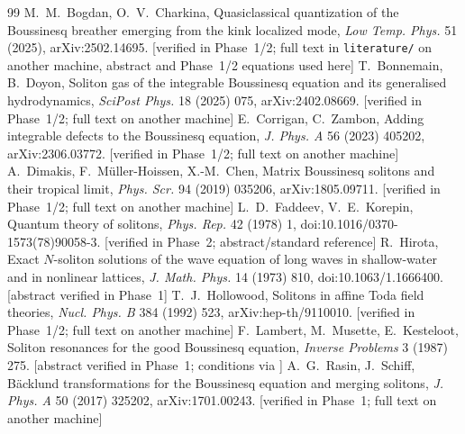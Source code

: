 \documentclass[11pt,a4paper]{article}
\theoremstyle{remark}
\begin{document}
\begin{thebibliography}{99}\small
{} M.~M.~Bogdan, O.~V.~Charkina, Quasiclassical quantization of the Boussinesq breather emerging from the kink localized mode, \emph{Low Temp. Phys.} 51 (2025), arXiv:2502.14695. [verified in Phase~1/2; full text in \texttt{literature/} on another machine, abstract and Phase~1/2 equations used here]
 T.~Bonnemain, B.~Doyon, Soliton gas of the integrable Boussinesq equation and its generalised hydrodynamics, \emph{SciPost Phys.} 18 (2025) 075, arXiv:2402.08669. [verified in Phase~1/2; full text on another machine]
 E.~Corrigan, C.~Zambon, Adding integrable defects to the Boussinesq equation, \emph{J. Phys. A} 56 (2023) 405202, arXiv:2306.03772. [verified in Phase~1/2; full text on another machine]
 A.~Dimakis, F.~M\"uller-Hoissen, X.-M.~Chen, Matrix Boussinesq solitons and their tropical limit, \emph{Phys. Scr.} 94 (2019) 035206, arXiv:1805.09711. [verified in Phase~1/2; full text on another machine]
 L.~D.~Faddeev, V.~E.~Korepin, Quantum theory of solitons, \emph{Phys. Rep.} 42 (1978) 1, doi:10.1016/0370-1573(78)90058-3. [verified in Phase~2; abstract/standard reference]
 R.~Hirota, Exact $N$-soliton solutions of the wave equation of long waves in shallow-water and in nonlinear lattices, \emph{J. Math. Phys.} 14 (1973) 810, doi:10.1063/1.1666400. [abstract verified in Phase~1]
 T.~J.~Hollowood, Solitons in affine Toda field theories, \emph{Nucl. Phys. B} 384 (1992) 523, arXiv:hep-th/9110010. [verified in Phase~1/2; full text on another machine]
 F.~Lambert, M.~Musette, E.~Kesteloot, Soliton resonances for the good Boussinesq equation, \emph{Inverse Problems} 3 (1987) 275. [abstract verified in Phase~1; conditions via \cite{BD}]
 A.~G.~Rasin, J.~Schiff, B\"acklund transformations for the Boussinesq equation and merging solitons, \emph{J. Phys. A} 50 (2017) 325202, arXiv:1701.00243. [verified in Phase~1; full text on another machine]
\end{thebibliography}
\end{document}
